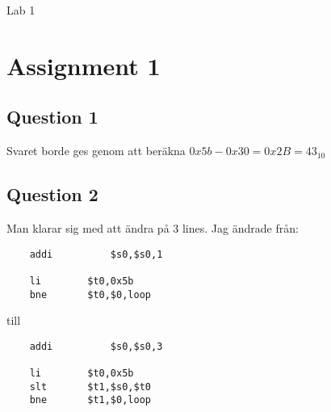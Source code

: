 \documentclass[a4paper,11p]{article}
\begin{document}
\begin{center}
Lab 1
\end{center}
\section{Assignment 1}
\subsection{Question 1}
Svaret borde ges genom att beräkna $0x5b - 0x30 = 0x2B = 43_{10}$
\subsection{Question 2}
Man klarar sig med att ändra på 3 lines. Jag ändrade från:
\begin{verbatim}
    addi	      $s0,$s0,1	
	
    li        $t0,0x5b
    bne       $t0,$0,loop
\end{verbatim}
till
\begin{verbatim}
    addi	      $s0,$s0,3	
	
    li        $t0,0x5b
    slt       $t1,$s0,$t0
    bne       $t1,$0,loop
\end{verbatim}
\end{document}
